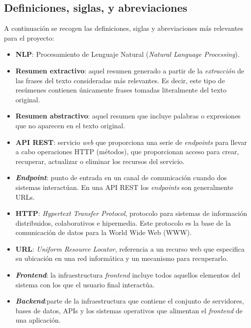 \subsection{Definiciones, siglas, y abreviaciones}

A continuación se recogen las definiciones, siglas y abreviaciones más relevantes para el proyecto:

\vspace{-0.3cm}
\begin{itemize} [\textbullet]
	\item \textbf{NLP}: Procesamiento de Lenguaje Natural (\emph{Natural Language Processing}).
	\vspace{-0.1cm}
	\item \textbf{Resumen extractivo}: aquel resumen generado a partir de la \emph{extracción} de las frases del texto consideradas más relevantes. Es decir, este tipo de resúmenes contienen únicamente frases tomadas literalmente del texto original.
	\vspace{-0.1cm}
	\item \textbf{Resumen abstractivo}: aquel resumen que incluye palabras o expresiones que no aparecen en el texto original.
	\vspace{-0.1cm}
	\item \textbf{API REST}: servicio \emph{web} que proporciona una serie de \emph{endpoints} para llevar a cabo operaciones HTTP (métodos), que proporcionan acceso para crear, recuperar, actualizar o eliminar los recursos del servicio.
	\vspace{-0.1cm}
	\item \textbf{\emph{Endpoint}}: punto de entrada en un canal de comunicación cuando dos sistemas interactúan. En una API REST los \emph{endpoints} son generalmente URLs.
	\vspace{-0.1cm}
	\item \textbf{HTTP}: \emph{Hypertext Transfer Protocol}, protocolo para sistemas de información distribuidos, colaborativos e hipermedia. Este protocolo es la base de la comunicación de datos para la World Wide Web (WWW).
	\vspace{-0.1cm}
	\item \textbf{URL}: \emph{Uniform Resource Locator}, referencia a un recurso web que especifica su ubicación en una red informática y un mecanismo para recuperarlo.
	\vspace{-0.1cm}
	\item \textbf{\emph{Frontend}}: la infraestructura \emph{frontend} incluye todos aquellos elementos del sistema con los que el usuario final interactúa.
	\vspace{-0.1cm}
	\item \textbf{\emph{Backend}}:parte de la infraestructura que contiene el conjunto de servidores, bases de datos, APIs y los sistemas operativos que alimentan el \emph{frontend} de una aplicación.
\end{itemize}

